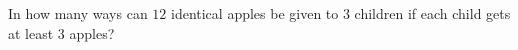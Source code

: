 In how many ways can $12$ identical apples be given to $3$ children if each child gets at least $3$ apples?

